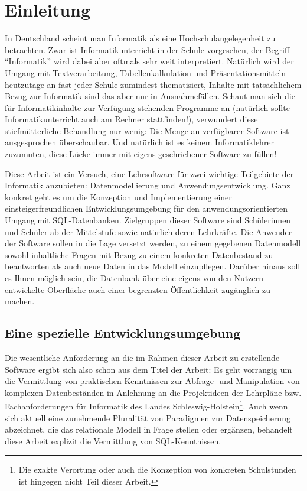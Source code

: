 \section{Einleitung}

In Deutschland scheint man Informatik als eine Hochschulangelegenheit zu betrachten. Zwar ist Informatikunterricht in der Schule vorgesehen, der Begriff ``Informatik'' wird dabei aber oftmals sehr weit interpretiert. Natürlich wird der Umgang mit Textverarbeitung, Tabellenkalkulation und Präsentationsmitteln heutzutage an fast jeder Schule zumindest thematisiert, Inhalte mit tatsächlichem Bezug zur Informatik sind das aber nur in Ausnahmefällen. Schaut man sich die für Informatikinhalte zur Verfügung stehenden Programme an (natürlich sollte Informatikunterricht auch am Rechner stattfinden!), verwundert diese stiefmütterliche Behandlung nur wenig: Die Menge an verfügbarer Software ist ausgesprochen überschaubar. Und natürlich ist es keinem Informatiklehrer zuzumuten, diese Lücke immer mit eigens geschriebener Software zu füllen!

Diese Arbeit ist ein Versuch, eine Lehrsoftware für zwei wichtige Teilgebiete der Informatik anzubieten: Datenmodellierung und Anwendungsentwicklung. Ganz konkret geht es um die Konzeption und Implementierung einer einsteigerfreundlichen Entwicklungsumgebung für den anwendungsorientierten Umgang mit SQL-Datenbanken. Zielgruppen dieser Software sind Schülerinnen und Schüler ab der Mittelstufe sowie natürlich deren Lehrkräfte. Die Anwender der Software sollen in die Lage versetzt werden, zu einem gegebenen Datenmodell sowohl inhaltliche Fragen mit Bezug zu einem konkreten Datenbestand zu beantworten als auch neue Daten in das Modell einzupflegen. Darüber hinaus soll es Ihnen möglich sein, die Datenbank über eine eigens von den Nutzern entwickelte Oberfläche auch einer begrenzten Öffentlichkeit zugänglich zu machen.

\subsection{Eine spezielle Entwicklungsumgebung}

Die wesentliche Anforderung an die im Rahmen dieser Arbeit zu erstellende Software ergibt sich also schon aus dem Titel der Arbeit: Es geht vorrangig um die Vermittlung von praktischen Kenntnissen zur Abfrage- und Manipulation von komplexen Datenbeständen in Anlehnung an die Projektideen der Lehrpläne \cite{lehrplan-inf-sek-1} bzw. Fachanforderungen \cite{lehrplan-inf-sek-2} für Informatik des Landes Schleswig-Holstein\footnote{Die exakte Verortung oder auch die Konzeption von konkreten Schulstunden ist hingegen nicht Teil dieser Arbeit.}. Auch wenn sich aktuell eine zunehmende Pluralität von Paradigmen zur Datenspeicherung abzeichnet, die das relationale Modell in Frage stellen oder ergänzen, behandelt diese Arbeit explizit die Vermittlung von SQL-Kenntnissen. 

